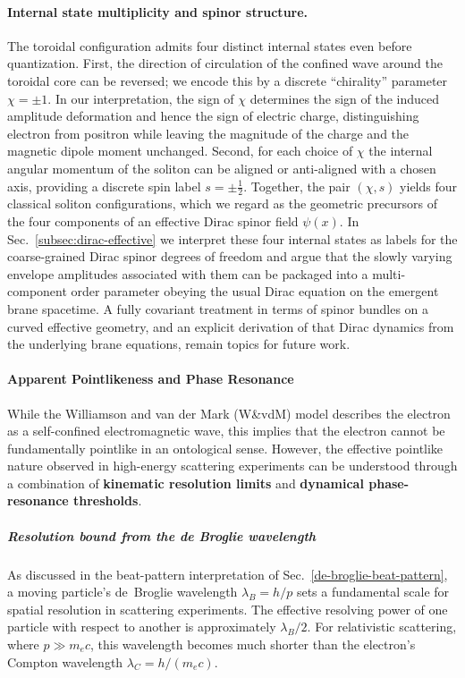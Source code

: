 \paragraph{Internal state multiplicity and spinor structure.}
The toroidal configuration admits four distinct internal states even
before quantization. First, the direction of circulation of the confined
wave around the toroidal core can be reversed; we encode this by a
discrete ``chirality'' parameter $\chi = \pm 1$. In our interpretation,
the sign of $\chi$ determines the sign of the induced amplitude
deformation and hence the sign of electric charge, distinguishing
electron from positron while leaving the magnitude of the charge and the
magnetic dipole moment unchanged. Second, for each choice of $\chi$ the
internal angular momentum of the soliton can be aligned or
anti-aligned with a chosen axis, providing a discrete spin label
$s = \pm \tfrac{1}{2}$. Together, the pair $(\chi,s)$ yields four
classical soliton configurations, which we regard as the geometric
precursors of the four components of an effective Dirac spinor field
$\psi(x)$. In Sec.~\ref{subsec:dirac-effective} we interpret these four
internal states as labels for the coarse-grained Dirac spinor degrees of
freedom and argue that the slowly varying envelope amplitudes
associated with them can be packaged into a multi-component order
parameter obeying the usual Dirac equation on the emergent brane
spacetime. A fully covariant treatment in terms of spinor bundles on a
curved effective geometry, and an explicit derivation of that Dirac
dynamics from the underlying brane equations, remain topics for future
work.

\paragraph{Apparent Pointlikeness and Phase Resonance}\label{apparent-pointlikeness-and-phase-resonance}

While the Williamson and van der Mark (W\&vdM) model describes the electron as a self-confined electromagnetic wave,
this implies that the electron cannot be fundamentally pointlike in an ontological sense.
However, the effective pointlike nature observed in high-energy scattering experiments can be understood
through a combination of \textbf{kinematic resolution limits} and \textbf{dynamical phase-resonance thresholds}.

\subparagraph{Resolution bound from the de Broglie wavelength}

As discussed in the beat-pattern interpretation of Sec.~\ref{de-broglie-beat-pattern}, a moving
particle's de~Broglie wavelength $\lambda_B = h/p$ sets a fundamental scale for spatial resolution
in scattering experiments. The effective resolving power of one particle with respect to another
is approximately $\lambda_B/2$. For relativistic scattering, where $p \gg m_e c$, this wavelength
becomes much shorter than the electron's Compton wavelength $\lambda_C = h/(m_e c)$.

